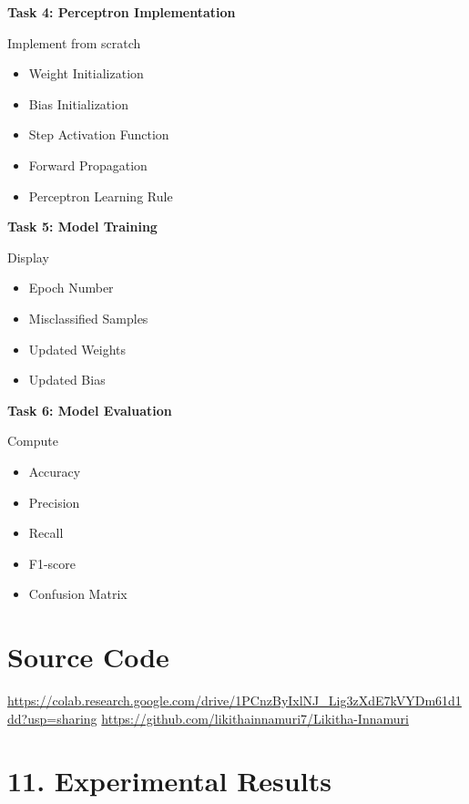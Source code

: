 \documentclass[11pt]{article}
\begin{document}
\textbf{Task 4: Perceptron Implementation}

Implement from scratch

\begin{itemize}
\item Weight Initialization
\item Bias Initialization
\item Step Activation Function
\item Forward Propagation
\item Perceptron Learning Rule
\end{itemize}

\vspace{2mm}

\textbf{Task 5: Model Training}

Display

\begin{itemize}
\item Epoch Number
\item Misclassified Samples
\item Updated Weights
\item Updated Bias
\end{itemize}

\vspace{2mm}

\textbf{Task 6: Model Evaluation}

Compute

\begin{itemize}
\item Accuracy
\item Precision
\item Recall
\item F1-score
\item Confusion Matrix
\end{itemize}


\section*{Source Code}

\url{https://colab.research.google.com/drive/1PCnzByIxlNJ_Lig3zXdE7kVYDm61d1dd?usp=sharing}
\url{https://github.com/likithainnamuri7/Likitha-Innamuri}


\section*{11. Experimental Results}
\end{document}
